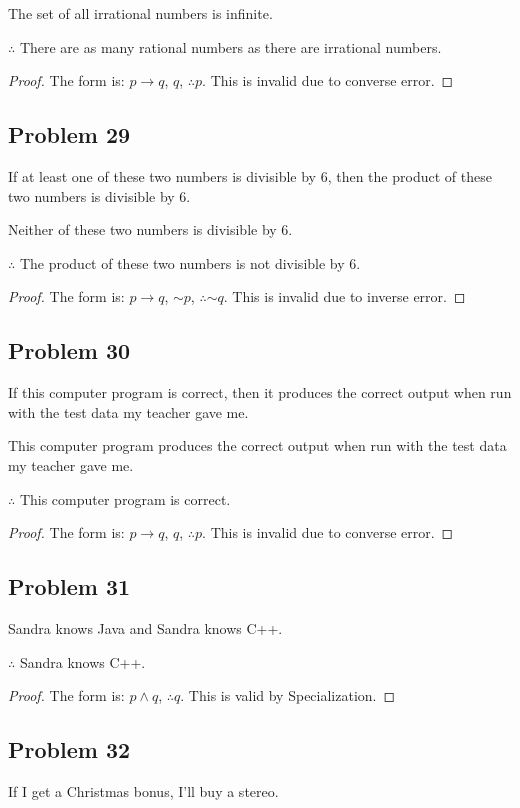 \documentclass[14pt]{extarticle}
\begin{document}
The set of all irrational numbers is infinite.

$\therefore$ There are as many rational numbers as there are
irrational numbers.

\begin{proof}
The form is: $p \to q$, $q$, $\therefore p$. This is invalid due to converse
error.
\end{proof}

\subsection{Problem 29}
If at least one of these two numbers is divisible by 6, then the product of
these two numbers is divisible by 6.

Neither of these two numbers is divisible by 6.

$\therefore$ The product of these two numbers is not divisible by 6.

\begin{proof}
The form is: $p \to q$, ${\sim p}$, $\therefore {\sim q}$. This is invalid due
to inverse error.
\end{proof}

\subsection{Problem 30}
If this computer program is correct, then it produces the correct output when
run with the test data my teacher gave me.

This computer program produces the correct output when run with the test data my
teacher gave me.

$\therefore$ This computer program is correct.

\begin{proof}
The form is: $p \to q$, $q$, $\therefore p$. This is invalid due to converse
error.
\end{proof}

\subsection{Problem 31}
Sandra knows Java and Sandra knows C++.

$\therefore$ Sandra knows C++.

\begin{proof}
The form is: $p \wedge q$, $\therefore q$. This is valid by Specialization.
\end{proof}

\subsection{Problem 32}
If I get a Christmas bonus, I’ll buy a stereo.
\end{document}
